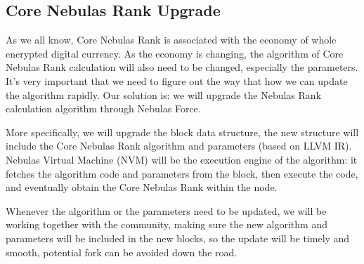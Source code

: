 \subsection{Core Nebulas Rank Upgrade}
As we all know, Core Nebulas Rank is associated with the economy of whole encrypted digital currency. As the economy is changing, the algorithm of Core Nebulas Rank calculation will also need to be changed, especially the parameters. It’s very important that we need to figure out the way that how we can update the algorithm rapidly. Our solution is: we will upgrade the Nebulas Rank calculation algorithm through Nebulas Force.

More specifically, we will upgrade the block data structure, the new structure will include the Core Nebulas Rank algorithm and parameters (based on LLVM IR). Nebulas Virtual Machine (NVM) will be the execution engine of the algorithm: it fetches the algorithm code and parameters from the block, then execute the code, and eventually obtain the Core Nebulas Rank within the node.

Whenever the algorithm or the parameters need to be updated, we will be working together with the community, making sure the new algorithm and parameters will be included in the new blocks, so the update will be timely and smooth, potential fork can be avoided down the road.
